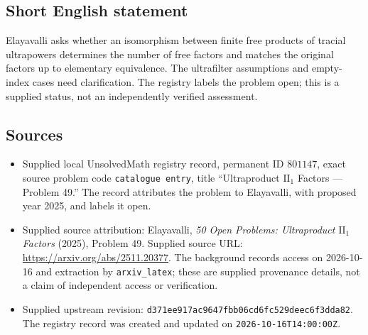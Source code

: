 \documentclass[11pt]{article}
\begin{document}
\subsection{Short English statement}
Elayavalli asks whether an isomorphism between finite free products of tracial ultrapowers determines the number of free factors and matches the original factors up to elementary equivalence. The ultrafilter assumptions and empty-index cases need clarification. The registry labels the problem open; this is a supplied status, not an independently verified assessment.
\subsection{Sources}
\begin{itemize}
\item Supplied local UnsolvedMath registry record, permanent ID \(801147\), exact source problem code \texttt{catalogue entry}, title ``Ultraproduct \(\mathrm{II}_1\) Factors --- Problem 49.'' The record attributes the problem to Elayavalli, with proposed year 2025, and labels it open.
\item Supplied source attribution: Elayavalli, \emph{50 Open Problems: Ultraproduct \(\mathrm{II}_1\) Factors} (2025), Problem 49. Supplied source URL: \url{https://arxiv.org/abs/2511.20377}. The background records access on 2026-10-16 and extraction by \texttt{arxiv\_latex}; these are supplied provenance details, not a claim of independent access or verification.
\item Supplied upstream revision: \texttt{d371ee917ac9647fbb06cd6fc529deec6f3dda82}. The registry record was created and updated on \texttt{2026-10-16T14:00:00Z}.
\end{itemize}
\end{document}
